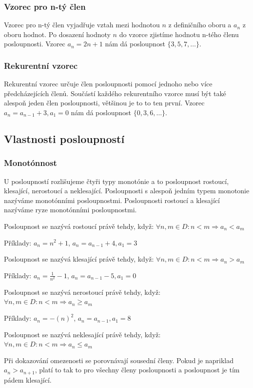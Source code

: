 \documentclass[12pt]{article}
\begin{document}
\subsubsection*{Vzorec pro n-tý člen}
Vzorec pro n-tý člen vyjadřuje vztah mezi hodnotou $n$ z definičního oboru a $a_n$ z oboru hodnot.
Po dosazení hodnoty $n$ do vzorce zjistíme hodnotu n-tého členu posloupnosti. Vzorec $a_n = 2n + 1$
nám dá posloupnost $\{3, 5, 7, \dots\}$.
\subsubsection*{Rekurentní vzorec}
Rekurentní vzorec určuje člen posloupnosti pomocí jednoho nebo více předcházejících členů. Součástí
každého rekurentního vzorce musí být také alespoň jeden člen posloupnosti, většinou je to to ten
první. Vzorec $a_n = a_{n-1} + 3, a_1 = 0$ nám dá posloupnost $\{0, 3, 6, \dots\}$.
\subsection*{Vlastnosti posloupností}
\subsubsection*{Monotónnost}
U posloupností rozlišujeme čtyři typy monotónie a to posloupnost rostoucí, klesající, nerostoucí a
neklesající. Posloupnosti s alespoň jedním typem monotonie nazýváme monotónními posloupnostmi.
Posloupnosti rostoucí a klesající nazýváme ryze monotónními posloupnostmi.

Posloupnost se nazývá rostoucí právě tehdy, když: $\forall n,m \in D : n < m \Rightarrow a_n < a_m$

Příklady: $a_n = n^2 + 1$, $a_n = a_{n-1} + 4, a_1 = 3$

Posloupnost se nazývá klesající právě tehdy, když: $\forall n,m \in D : n < m \Rightarrow a_n > a_m$

Příklady: $a_n = \frac{1}{n^2} -1$, $a_n = a_{n-1} - 5, a_1 = 0$

Posloupnost se nazývá nerostoucí právě tehdy, když: $\forall n,m \in D : n < m \Rightarrow a_n \ge
a_m$

Příklady: $a_n = -(n)^2$, $a_n = a_{n-1}, a_1 = 8$

Posloupnost se nazývá neklesající právě tehdy, když: $\forall n,m \in D : n < m \Rightarrow a_n \le
a_m$

Při dokazování omezenosti se porovnávají sousední členy. Pokud je napriklad $a_n > a_{n+1}$, platí to
tak to pro všechny členy posloupnosti a posloupnost je tím pádem klesající.
\end{document}
